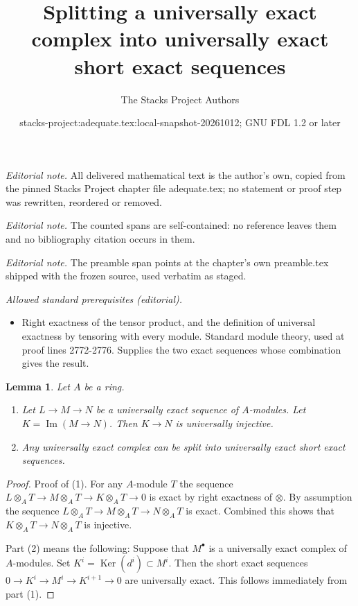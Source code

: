 \documentclass{stacks-project}
\title{Splitting a universally exact complex into universally exact short exact sequences}
\author{The Stacks Project Authors}
\date{stacks-project:adequate.tex:local-snapshot-20261012; GNU FDL 1.2 or later}
\theoremstyle{plain}
\newtheorem{lemma}[subsection]{Lemma}
\theoremstyle{definition}
\theoremstyle{remark}
\numberwithin{equation}{subsection}
\def\Ker{\mathop{\mathrm{Ker}}}
\def\Im{\mathop{\mathrm{Im}}}
\begin{document}
\maketitle
\noindent\textit{Editorial note.} All delivered mathematical text is the author's own, copied from the pinned Stacks Project chapter file adequate.tex; no statement or proof step was rewritten, reordered or removed.\par\medskip
\noindent\textit{Editorial note.} The counted spans are self-contained: no reference leaves them and no bibliography citation occurs in them.\par\medskip
\noindent\textit{Editorial note.} The preamble span points at the chapter's own preamble.tex shipped with the frozen source, used verbatim as staged.\par\medskip
\noindent\textit{Allowed standard prerequisites (editorial).}\begin{itemize}
\item Right exactness of the tensor product, and the definition of universal exactness by tensoring with every module. Standard module theory, used at proof lines 2772-2776. Supplies the two exact sequences whose combination gives the result.
\end{itemize}\medskip
\begin{lemma}
\label{lemma-split-universally-exact-sequence}
Let $A$ be a ring.
\begin{enumerate}
\item Let $L \to M \to N$ be a universally exact sequence
of $A$-modules. Let $K = \Im(M \to N)$.
Then $K \to N$ is universally injective.
\item Any universally exact complex
can be split into universally exact short exact sequences.
\end{enumerate}
\end{lemma}

\begin{proof}
Proof of (1). For any $A$-module $T$ the sequence
$L \otimes_A T \to M \otimes_A T \to K \otimes_A T \to 0$ is exact
by right exactness of $\otimes$. By assumption the sequence
$L \otimes_A T \to M \otimes_A T \to N \otimes_A T$ is exact.
Combined this shows that $K \otimes_A T \to N \otimes_A T$ is injective.

\medskip\noindent
Part (2) means the following: Suppose that $M^\bullet$ is a universally
exact complex of $A$-modules. Set $K^i = \Ker(d^i) \subset M^i$.
Then the short exact sequences $0 \to K^i \to M^i \to K^{i + 1} \to 0$
are universally exact. This follows immediately from part (1).
\end{proof}
\end{document}
